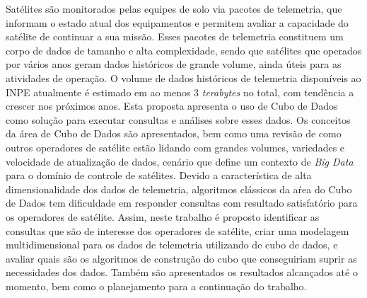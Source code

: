 
\begin{resumo}

\hypertarget{estilo:resumo}{} %

Satélites são monitorados pelas equipes de solo via pacotes de telemetria, que informam o estado atual dos equipamentos e permitem avaliar a capacidade do satélite de continuar a sua missão.
Esses pacotes de telemetria constituem um corpo de dados de tamanho e alta complexidade, sendo que satélites que operados por vários anos geram dados históricos de grande volume, ainda úteis para as atividades de operação.
O volume de dados históricos de telemetria disponíveis ao INPE atualmente é estimado em ao menos 3 \textit{terabytes} no total, com tendência a crescer nos próximos anos.
{\color{cerulean}
Esta proposta apresenta o uso de Cubo de Dados como solução para executar consultas e análises sobre esses dados.
Os conceitos da área de Cubo de Dados são apresentados, bem como uma revisão de como outros operadores de satélite estão lidando com grandes volumes, variedades e velocidade de atualização de dados, cenário que define um contexto de \textit{Big Data} para o domínio de controle de satélites.
}
Devido a característica de alta dimensionalidade dos dados de telemetria, algoritmos clássicos da aŕea do Cubo de Dados tem dificuldade em responder consultas com resultado satisfatório para os operadores de satélite.
Assim, neste trabalho é proposto identificar as consultas que são de interesse dos operadores de satélite, criar uma modelagem multidimensional para os dados de telemetria utilizando de cubo de dados, e avaliar quais são os algoritmos de construção do cubo que conseguiriam suprir as necessidades dos dados.
{\color{cerulean}
Também são apresentados os resultados alcançados até o momento, bem como o planejamento para a continuação do trabalho.
}


\end{resumo}
